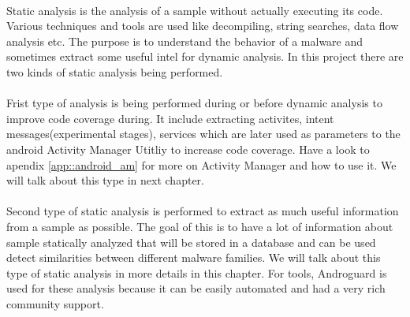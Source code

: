 \documentclass[../main.tex]{subfile}
\begin{document}
	
		\paragraph{} Static analysis is the analysis of a sample without actually executing its code. Various techniques and tools are used like decompiling, string searches, data flow analysis etc. The purpose is to understand the behavior of a malware and sometimes extract some useful intel for dynamic analysis. In this project there are two kinds of static analysis being performed.
		\paragraph{} Frist type of analysis is being performed during or before dynamic analysis to improve code coverage during. It include extracting activites, intent messages(experimental stages), services which are later used as parameters to the android Activity Manager Utitliy to increase code coverage. Have a look to apendix \ref{app::android_am} for more on Activity Manager and how to use it. We will talk about this type in next chapter.
		
		\paragraph{} Second type of static analysis is performed to extract as much useful information from a sample as possible. The goal of this is to have a lot of information about sample statically analyzed that will be stored in a database and can be used detect similarities between different malware families. We will talk about this type of static analysis in more details in this chapter. For tools, Androguard is used for these analysis because it can be easily automated and had a very rich community support.
\end{document}
